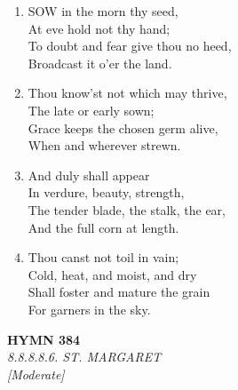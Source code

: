 \documentclass[11pt,a4paper]{article}
\begin{document}
\begin{enumerate}
    \item SOW in the morn thy seed, \\
        At eve hold not thy hand; \\
        To doubt and fear give thou no heed, \\
        Broadcast it o'er the land.

    \item Thou know'st not which may thrive, \\
        The late or early sown; \\
        Grace keeps the chosen germ alive, \\
        When and wherever strewn.

    \item And duly shall appear \\
        In verdure, beauty, strength, \\
        The tender blade, the stalk, the ear, \\
        And the full corn at length.

    \item Thou canst not toil in vain; \\
        Cold, heat, and moist, and dry \\
        Shall foster and mature the grain \\
        For garners in the sky.

\end{enumerate}

\newpage
\begin{center}
    {\Large \textbf{HYMN 384}}
    \\
    \textit{8.8.8.8.6. ST. MARGARET}
    \\
    \textit{\small [Moderate]}
\end{center}
\vspace{1em}
\end{document}
